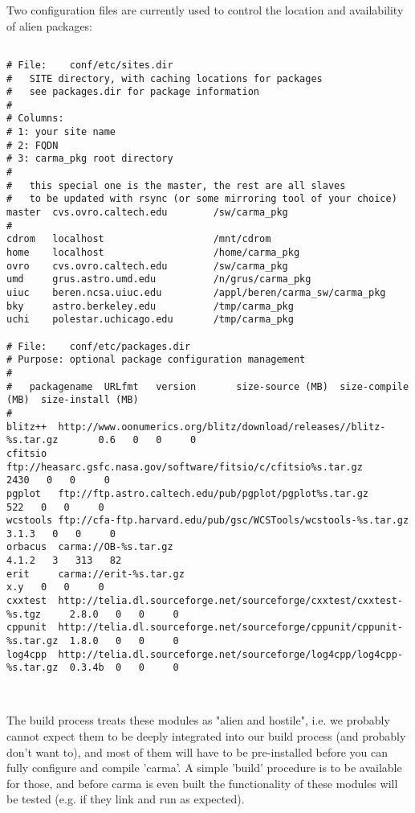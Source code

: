 \documentclass{article}
\begin{document}
Two configuration files are currently used to control the location and availability
of alien packages:

\footnotesize
\begin{verbatim}

# File:    conf/etc/sites.dir
#   SITE directory, with caching locations for packages
#   see packages.dir for package information
#
# Columns:
# 1: your site name
# 2: FQDN
# 3: carma_pkg root directory
#
#   this special one is the master, the rest are all slaves
#   to be updated with rsync (or some mirroring tool of your choice)
master  cvs.ovro.caltech.edu        /sw/carma_pkg
#
cdrom   localhost                   /mnt/cdrom
home    localhost                   /home/carma_pkg
ovro    cvs.ovro.caltech.edu        /sw/carma_pkg
umd     grus.astro.umd.edu          /n/grus/carma_pkg
uiuc    beren.ncsa.uiuc.edu         /appl/beren/carma_sw/carma_pkg
bky     astro.berkeley.edu          /tmp/carma_pkg
uchi    polestar.uchicago.edu       /tmp/carma_pkg

# File:    conf/etc/packages.dir
# Purpose: optional package configuration management
#
#   packagename  URLfmt   version       size-source (MB)  size-compile (MB)  size-install (MB)
#
blitz++  http://www.oonumerics.org/blitz/download/releases//blitz-%s.tar.gz       0.6   0   0     0
cfitsio  ftp://heasarc.gsfc.nasa.gov/software/fitsio/c/cfitsio%s.tar.gz          2430   0   0     0
pgplot   ftp://ftp.astro.caltech.edu/pub/pgplot/pgplot%s.tar.gz                   522   0   0     0
wcstools ftp://cfa-ftp.harvard.edu/pub/gsc/WCSTools/wcstools-%s.tar.gz          3.1.3   0   0     0
orbacus  carma://OB-%s.tar.gz                                                   4.1.2   3   313   82
erit     carma://erit-%s.tar.gz                                                   x.y   0   0     0
cxxtest  http://telia.dl.sourceforge.net/sourceforge/cxxtest/cxxtest-%s.tgz     2.8.0   0   0     0
cppunit  http://telia.dl.sourceforge.net/sourceforge/cppunit/cppunit-%s.tar.gz  1.8.0   0   0     0
log4cpp  http://telia.dl.sourceforge.net/sourceforge/log4cpp/log4cpp-%s.tar.gz  0.3.4b  0   0     0



\end{verbatim} 
\normalsize


The build process treats these modules as "alien and hostile",
i.e. we probably cannot expect them to be deeply integrated into our
build process (and probably don't want to),
and most of them will have to be pre-installed before
you can fully configure and compile 'carma'. A simple 'build' procedure is
to be available for those, and before carma is even built the
functionality of these modules will be tested (e.g. if they link and
run as expected).
\end{document}
